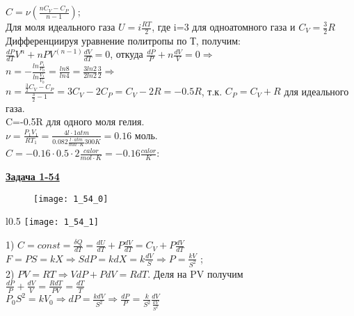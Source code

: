 \documentclass[12pt]{article}
\begin{document}
{$C=\nu(\frac{nC_V-C_P}{n-1})$; \\

Для моля идеального газа $U=i\frac{RT}{2}$, где i=3 для одноатомного газа и $C_V=\frac{3}{2}R $\\

Дифференциируя уравнение политропы по Т, получим: \\
$\frac{dP}{dT}V^n+nPV^(n-1)\frac{dV}{dT}=0$, откуда $\frac{dP}{P}+n\frac{dV}{V}=0 \Rightarrow$\\

$n=-\frac{ln\frac{P_1}{P_0}}{ln\frac{V_1}{V_0}}=\frac{ln8}{ln4}=\frac{3ln2}{2ln2}\frac{3}{2}\Rightarrow$\\

$n=\frac{\frac{3}{2}C_V-C_P}{\frac{3}{2}-1}=3C_V-2C_P=C_V-2R=-0.5R$, т.к. $C_P=C_V+R$ для идеального газа.\\

C=-0.5R для одного моля гелия.\\

$\nu=\frac{P_1V_1}{RT_1}=\frac{4l\cdot1atm}{0.082\frac{l\cdot atm}{mol\cdot K}300 K}=0.16$ моль.\\

$C=-0.16\cdot 0.5\cdot 2\frac{calor}{mol\cdot K}=-0.16\frac{calor}{K}$:

\newpage


{\underline\bf Задача 1-54}

\begin{figure}[h]
\texttt{[image: 1\_54\_0]}
\end{figure}

\begin{wrapfigure}[13]{l}{0.5\linewidth}
\vspace{ -4ex}
\texttt{[image: 1\_54\_1]}
\end{wrapfigure}

1) $C=const=\frac{\delta Q}{dT}=\frac{dU}{dT}+P\frac{dV}{dT}=C_V+P\frac{dV}{dT}$\\

$F=PS=kX \Rightarrow SdP=kdX=k\frac{dV}{S} \Rightarrow P=\frac{kV}{S^2}$ ;\\

2) $PV=RT \Rightarrow VdP+PdV=RdT$. Деля на PV получим\\

$\frac{dP}{P}+\frac{dV}{V}=\frac{RdT}{PV}=\frac{dT}{T}$\\

$P_0S^2=kV_0 \Rightarrow dP=\frac{kdV}{S^2} \Rightarrow \frac{dP}{P}=\frac{k}{S^2}\frac{dV}{\frac{kV}{S^2}}$\\

}
\end{document}
